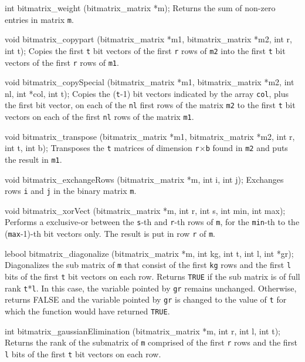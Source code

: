 {int bitmatrix_weight (bitmatrix_matrix *m);
\endcode
 \tab
 Returns the sum of non-zero entries in matrix {\tt *m}.
 \endtab
 \code

void bitmatrix_copypart (bitmatrix_matrix *m1, bitmatrix_matrix *m2,
                         int r, int t);
\endcode
 \tab
Copies the first {\tt t} bit vectors of the first {\tt r} rows of
{\tt m2} into the first {\tt t} bit vectors of the first {\tt r} rows of {\tt m1}.
 \endtab
\code

void bitmatrix_copySpecial (bitmatrix_matrix *m1, bitmatrix_matrix *m2,
                            int nl, int *col, int t);
\endcode
 \tab
Copies the ({\tt t}-1) bit vectors indicated by the array {\tt col},
plus the first bit vector, on each of the {\tt nl} first rows of the matrix
{\tt m2} to the first {\tt t} bit vectors
on each of the first {\tt nl} rows of the matrix {\tt m1}.
 \endtab
\code

void bitmatrix_transpose (bitmatrix_matrix *m1, bitmatrix_matrix *m2,
                          int r, int t, int b);
\endcode
 \tab
Transposes the {\tt t} matrices of dimension {\tt r}$\times${\tt b}
found in {\tt m2} and puts the result in {\tt m1}.
 \endtab
\code

void bitmatrix_exchangeRows (bitmatrix_matrix *m, int i, int j);
\endcode
 \tab
Exchanges rows {\tt i} and {\tt j} in the binary matrix {\tt *m}.
 \endtab
\code

void bitmatrix_xorVect (bitmatrix_matrix *m, int r, int s, int min, int max);
\endcode
 \tab
Performs a exclusive-or between the {\tt s}-th and {\tt r}-th rows of {\tt m},
for the {\tt min}-th to the ({\tt max}-1)-th bit vectors only.
The result is put in row {\tt r} of {\tt m}.
 \endtab
\code

lebool bitmatrix_diagonalize (bitmatrix_matrix *m, int kg, int t, int l, int *gr);
\endcode
\tab
Diagonalizes the sub matrix of {\tt m} that consist of the first {\tt kg} rows
and the first {\tt l} bits of the first {\tt t} bit vectors on each row.
Returns {\tt TRUE} if the sub matrix is of full rank {\tt t}*{\tt l}.
In this case, the variable pointed by {\tt gr} remains unchanged.
Otherwise, returns FALSE and the variable pointed by {\tt gr} is changed
to the value of {\tt t} for which the function would have returned {\tt TRUE}.
 \endtab
\code

int bitmatrix_gaussianElimination (bitmatrix_matrix *m, int r, int l, int t);
\endcode
 \tab
Returns the rank of the submatrix of {\tt m} comprised of the first {\tt r} rows
and the first {\tt l} bits of the first {\tt t} bit vectors on each row.
 \endtab
\code

}
